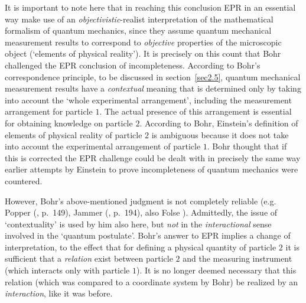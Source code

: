 \documentclass[12pt]{article}
\begin{document}
It is important to note here that in reaching this conclusion EPR
in an essential way make use of an {\em objectivistic}-realist
interpretation of the mathematical formalism of quantum mechanics,
since they assume quantum mechanical measurement results to
correspond to {\em objective} properties of the microscopic object
(`elements of physical reality'). It is precisely on this count
that Bohr \cite{Bohr35} challenged the EPR conclusion of
incompleteness. According to Bohr's correspondence principle, to
be discussed in section~\ref{sec2.5}, quantum mechanical
measurement results have a {\em contextual} meaning that is
determined only by taking into account the `whole experimental
arrangement', including the measurement arrangement for particle
$1$. The actual presence of this arrangement is essential for
obtaining knowledge on particle $2$. According to Bohr, Einstein's
definition of elements of physical reality of particle $2$ is
ambiguous because it does not take into account the experimental
arrangement of particle $1$. Bohr thought that if this is
corrected the EPR challenge could be dealt with in precisely the
same way earlier attempts by Einstein to prove incompleteness of
quantum mechanics were countered.

However, Bohr's above-mentioned judgment is not completely
reliable (e.g. Popper (\cite{Pop}, p.~149), Jammer (\cite{Jammer},
p.~194), also Folse \cite{Folse85}). Admittedly, the issue of
`contextuality' is used by him also here, but {\em not} in the
{\em interactional} sense involved in the `quantum postulate'.
Bohr's answer to EPR implies a change of interpretation, to the
effect that for defining a physical quantity of particle $2$ it is
sufficient that a {\em relation} exist between particle $2$ and
the measuring instrument (which interacts only with particle $1$).
It is no longer deemed necessary that this relation (which was
compared to a coordinate system by Bohr) be realized by an {\em
interaction}, like it was before.
\end{document}

